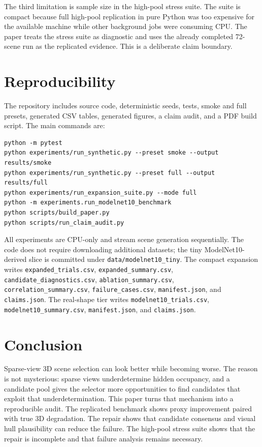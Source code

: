 \documentclass{article}
\begin{document}
The third limitation is sample size in the high-pool stress suite. The suite is
compact because full high-pool replication in pure Python was too expensive for
the available machine while other background jobs were consuming CPU. The
paper treats the stress suite as diagnostic and uses the already completed
72-scene run as the replicated evidence. This is a deliberate claim boundary.

\section{Reproducibility}

The repository includes source code, deterministic seeds, tests, smoke and full
presets, generated CSV tables, generated figures, a claim audit, and a PDF
build script. The main commands are:
{\footnotesize
\begin{verbatim}
python -m pytest
python experiments/run_synthetic.py --preset smoke --output results/smoke
python experiments/run_synthetic.py --preset full --output results/full
python experiments/run_expansion_suite.py --mode full
python -m experiments.run_modelnet10_benchmark
python scripts/build_paper.py
python scripts/run_claim_audit.py
\end{verbatim}
}
All experiments are CPU-only and stream scene generation sequentially. The code
does not require downloading additional datasets; the tiny ModelNet10-derived
slice is committed under \texttt{data/modelnet10\_tiny}. The compact expansion writes
\texttt{expanded\_trials.csv}, \texttt{expanded\_summary.csv},
\texttt{candidate\_diagnostics.csv}, \texttt{ablation\_summary.csv},
\texttt{correlation\_summary.csv}, \texttt{failure\_cases.csv},
\texttt{manifest.json}, and \texttt{claims.json}. The real-shape tier writes
\texttt{modelnet10\_trials.csv}, \texttt{modelnet10\_summary.csv},
\texttt{manifest.json}, and \texttt{claims.json}.

\section{Conclusion}

Sparse-view 3D scene selection can look better while becoming worse. The
reason is not mysterious: sparse views underdetermine hidden occupancy, and a
candidate pool gives the selector more opportunities to find candidates that
exploit that underdetermination. This paper turns that mechanism into a
reproducible audit. The replicated benchmark shows proxy improvement paired
with true 3D degradation. The repair shows that candidate consensus and visual
hull plausibility can reduce the failure. The high-pool stress suite shows that
the repair is incomplete and that failure analysis remains necessary.
\end{document}
